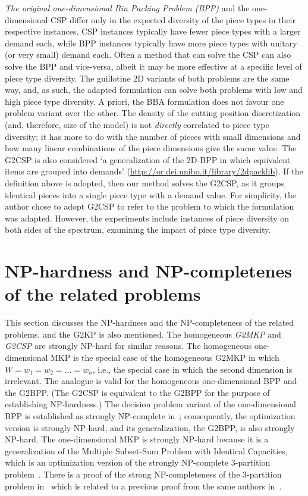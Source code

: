 \emph{The original one-dimensional Bin Packing Problem (BPP)} and the one-dimensional CSP differ only in the expected diversity of the piece types in their respective instances. CSP instances typically have fewer piece types with a larger demand each, while BPP instances typically have more piece types with unitary (or very small) demand each.
Often a method that can solve the CSP can also solve the BPP and vice-versa, albeit it may be more effective at a specific level of piece type diversity.
The guillotine 2D variants of both problems are the same way, and, as such, the adapted formulation can solve both problems with low and high piece type diversity.
A priori, the BBA formulation does not favour one problem variant over the other.
The density of the cutting position discretization (and, therefore, size of the model) is not \emph{directly} correlated to piece type diversity; it has more to do with the number of pieces with small dimensions and how many linear combinations of the piece dimensions give the same value.
The G2CSP is also considered `a generalization of the 2D-BPP in which equivalent items are grouped into demands' (\url{http://or.dei.unibo.it/library/2dpacklib}).
If the definition above is adopted, then our method solves the G2CSP, as it groups identical pieces into a single piece type with a demand value.
For simplicity, the author chose to adopt G2CSP to refer to the problem to which the formulation was adapted.
However, the experiments include instances of piece diversity on both sides of the spectrum, examining the impact of piece type diversity.

\section{NP-hardness and NP-completenes of the related problems}
\label{sec:np_hard_related_problems}

This section discusses the NP-hardness and the NP-completeness of the related problems, and the G2KP is also mentioned.
The homogeneous \emph{G2MKP} and \emph{G2CSP} are strongly NP-hard for similar reasons.
The homogeneous one-dimensional MKP is the special case of the homogeneous G2MKP in which \(W = w_1 = w_2 = \dots = w_n\), i.e., the special case in which the second dimension is irrelevant.
The analogue is valid for the homogeneous one-dimensional BPP and the G2BPP.
(The G2CSP is equivalent to the G2BPP for the purpose of establishing NP-hardness.)
The decision problem variant of the one-dimensional BPP is established as strongly NP-complete in~\citet{garey:1979}; consequently, the optimization version is strongly NP-hard, and its generalization, the G2BPP, is also strongly NP-hard.
The one-dimensional MKP is strongly NP-hard because it is a generalization of the Multiple Subset-Sum Problem with Identical Capacities, which is an optimization version of the strongly NP-complete 3-partition problem~\cite{martello:1990,kellerer:2010}.
There is a proof of the strong NP-completeness of the 3-partition problem in~\citet{garey:1979} which is related to a previous proof from the same authors in~\citet{garey:1975}.


